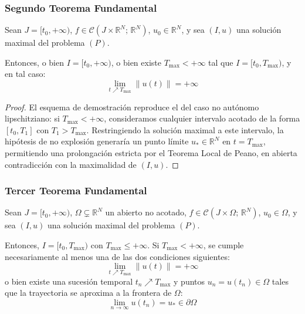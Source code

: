 \subsubsection{Segundo Teorema Fundamental}

\begin{teorema}
    Sean $J = [t_0, +\infty)$, $f \in \mathcal{C}(J \times \mathbb{R}^N; \, \mathbb{R}^N)$, $u_0 \in \mathbb{R}^N$, y sea $(I, u)$ una solución maximal del problema $(P)$.
    
    Entonces, o bien $I = [t_0, +\infty)$, o bien existe $T_{\max} < +\infty$ tal que $I = [t_0, T_{\max})$, y en tal caso:
    \[
        \lim_{t \nearrow T_{\max}} \|u(t)\| = +\infty
    \]
\end{teorema}

\begin{proof}
    El esquema de demostración reproduce el del caso no autónomo lipschitziano: si $T_{\max} < +\infty$, consideramos cualquier intervalo acotado de la forma $[t_0, T_1]$ con $T_1 > T_{\max}$. Restringiendo la solución maximal a este intervalo, la hipótesis de no explosión generaría un punto límite $u_* \in \mathbb{R}^N$ en $t = T_{\max}$, permitiendo una prolongación estricta por el Teorema Local de Peano, en abierta contradicción con la maximalidad de $(I, u)$.
\end{proof}

\subsubsection{Tercer Teorema Fundamental}

\begin{teorema}
    Sean $J = [t_0, +\infty)$, $\Omega \subsetneq \mathbb{R}^N$ un abierto no acotado, $f \in \mathcal{C}(J \times \Omega; \, \mathbb{R}^N)$, $u_0 \in \Omega$, y sea $(I, u)$ una solución maximal del problema $(P)$.
    
    Entonces, $I = [t_0, T_{\max})$ con $T_{\max} \leq +\infty$. Si $T_{\max} < +\infty$, se cumple necesariamente al menos una de las dos condiciones siguientes:
    \[
        \lim_{t \nearrow T_{\max}} \|u(t)\| = +\infty
    \]
    o bien existe una sucesión temporal $t_n \nearrow T_{\max}$ y puntos $u_n = u(t_n) \in \Omega$ tales que la trayectoria se aproxima a la frontera de $\Omega$:
    \[
        \lim_{n \to \infty} u(t_n) = u_* \in \partial \Omega
    \]
\end{teorema}


